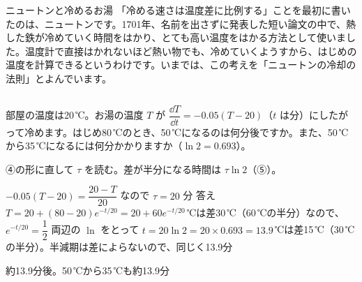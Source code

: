 \begin{kotoba}
\small
{}
\end{kotoba}

{}

\begin{column}{ニュートンと冷めるお湯}
「冷める速さは温度差に比例する」ことを最初に書いたのは、ニュートンです。1701年、名前を出さずに発表した短い論文の中で、熱した鉄が冷めていく時間をはかり、とても高い温度をはかる方法として使いました。温度計で直接はかれないほど熱い物でも、冷めていくようすから、はじめの温度を計算できるというわけです。いまでは、この考えを「ニュートンの冷却の法則」とよんでいます。
\end{column}


\begin{reidai}[差が半分になる時間]
部屋の温度は20\,℃。お湯の温度 $T$ が $\dfrac{\dd T}{\dd t}=-0.05(T-20)$（$t$ は分）にしたがって冷めます。はじめ80\,℃のとき、50\,℃になるのは何分後ですか。また、50\,℃から35\,℃になるには何分かかりますか（$\ln2=0.693$）。\par
\kangaekata ④の形に直して $\tau$ を読む。差が半分になる時間は $\tau\ln2$（⑤）。\par
\shiki $-0.05(T-20)=\dfrac{20-T}{20}$ なので $\tau=20$ 分\bkvieq
答え $T=20+(80-20)e^{-t/20}=20+60e^{-t/20}$\,℃は差30\,℃（60\,℃の半分）なので、$e^{-t/20}=\dfrac{1}{2}$\bkvieq
両辺の $\ln$ をとって $t=20\ln2=20\times0.693=13.9$\,℃は差15\,℃（30\,℃の半分）。半減期は差によらないので、同じく13.9分\par
\kotae 約13.9分後。50\,℃から35\,℃も約13.9分
\end{reidai}

